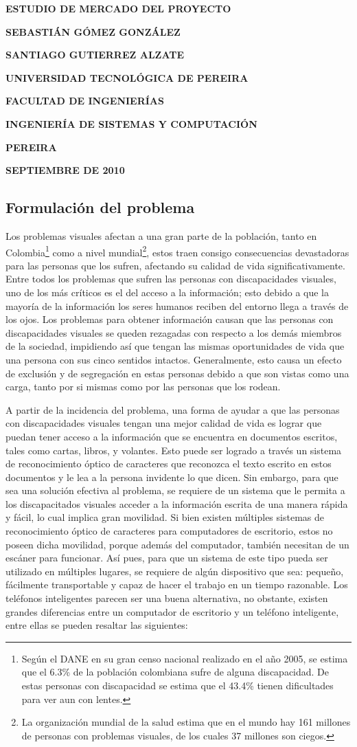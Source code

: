 \documentclass[a4paper, 12pt, oneside]{article}
\newcommand\portada{
	\begin{titlepage}
		\begin{center}
			{\large \bf ESTUDIO DE MERCADO DEL PROYECTO }
			\vfill
			{\large\bf SEBASTIÁN GÓMEZ GONZÁLEZ \par}
			{\large\bf SANTIAGO GUTIERREZ ALZATE \par}
			\vfill
			{\large\bf UNIVERSIDAD TECNOLÓGICA DE PEREIRA  \par}
			{\large\bf FACULTAD DE INGENIERÍAS \par}
			{\large\bf INGENIERÍA DE SISTEMAS Y COMPUTACIÓN \par}
			{\large\bf PEREIRA\par}
			{\large\bf SEPTIEMBRE DE 2010 \par}
		\end{center}
	\end{titlepage}
}
\begin{document}
\portada

	\tableofcontents
	
	\begin{center}
	\section{Formulación del problema}
	\end{center}

	Los problemas visuales afectan a una gran parte de la población, tanto en Colombia\footnote{Según el DANE en su gran censo nacional realizado en el año 2005, se estima que el 6.3\% de la población colombiana sufre de alguna discapacidad. De estas personas con discapacidad se estima que el 43.4\% tienen dificultades para ver aun con lentes.} como a nivel mundial\footnote{La organización mundial de la salud estima que en el mundo hay 161 millones de personas con problemas visuales, de los cuales 37 millones son ciegos.}, estos traen consigo consecuencias devastadoras para las personas que los sufren, afectando su calidad de vida significativamente. Entre todos los problemas que sufren las personas con discapacidades visuales, uno de los más críticos es el del acceso a la información; esto debido a que la mayoría de la información los seres humanos reciben del entorno llega a través de los ojos. Los problemas para obtener información causan que las personas con discapacidades visuales se queden rezagadas con respecto a los demás miembros de la sociedad, impidiendo así que tengan las mismas oportunidades de vida que una persona con sus cinco sentidos intactos. Generalmente, esto causa un efecto de exclusión y de segregación en estas personas debido a que son vistas como una carga, tanto por si mismas como por las personas que los rodean. 

	A partir de la incidencia del problema, una forma de ayudar a que las personas con discapacidades visuales tengan una mejor calidad de vida es lograr que puedan tener acceso a la información que se encuentra en documentos escritos, tales como cartas, libros, y volantes. Esto puede ser logrado a través un sistema de reconocimiento óptico de caracteres que reconozca el texto escrito en estos documentos y le lea a la persona invidente lo que dicen. Sin embargo, para que sea una solución efectiva al problema, se requiere de un sistema que le permita a los discapacitados visuales acceder a la información escrita de una manera rápida y fácil, lo cual implica gran movilidad. Si bien existen múltiples sistemas de reconocimiento óptico de caracteres para computadores de escritorio, estos no poseen dicha movilidad, porque además del computador, también necesitan de un escáner para funcionar. Así pues, para que un sistema de este tipo pueda ser utilizado en múltiples lugares, se requiere de algún dispositivo que sea: pequeño, fácilmente transportable y capaz de hacer el trabajo en un tiempo razonable. Los teléfonos inteligentes parecen ser una buena alternativa, no obstante, existen grandes diferencias entre un computador de escritorio y un teléfono inteligente, entre ellas se pueden resaltar las siguientes:
	
\end{document}
